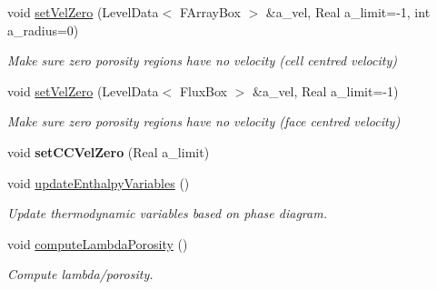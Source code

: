 \begin{DoxyCompactItemize}
\item 
\hypertarget{class_a_m_r_level_mushy_layer_aca6ded080c70e8ea040576861d832e09}{void \hyperlink{class_a_m_r_level_mushy_layer_aca6ded080c70e8ea040576861d832e09}{set\-Vel\-Zero} (Level\-Data$<$ F\-Array\-Box $>$ \&a\-\_\-vel, Real a\-\_\-limit=-\/1, int a\-\_\-radius=0)}\label{class_a_m_r_level_mushy_layer_aca6ded080c70e8ea040576861d832e09}

\begin{DoxyCompactList}\small\item\em Make sure zero porosity regions have no velocity (cell centred velocity) \end{DoxyCompactList}\item 
\hypertarget{class_a_m_r_level_mushy_layer_a14cee19cc957db8f3cce3e09fca9edf3}{void \hyperlink{class_a_m_r_level_mushy_layer_a14cee19cc957db8f3cce3e09fca9edf3}{set\-Vel\-Zero} (Level\-Data$<$ Flux\-Box $>$ \&a\-\_\-vel, Real a\-\_\-limit=-\/1)}\label{class_a_m_r_level_mushy_layer_a14cee19cc957db8f3cce3e09fca9edf3}

\begin{DoxyCompactList}\small\item\em Make sure zero porosity regions have no velocity (face centred velocity) \end{DoxyCompactList}\item 
\hypertarget{class_a_m_r_level_mushy_layer_ae3dcf62f2464245d7a3035cd1508061f}{void {\bfseries set\-C\-C\-Vel\-Zero} (Real a\-\_\-limit)}\label{class_a_m_r_level_mushy_layer_ae3dcf62f2464245d7a3035cd1508061f}

\item 
\hypertarget{class_a_m_r_level_mushy_layer_a8679a53e5cbddc3af173ea3ff5b574de}{void \hyperlink{class_a_m_r_level_mushy_layer_a8679a53e5cbddc3af173ea3ff5b574de}{update\-Enthalpy\-Variables} ()}\label{class_a_m_r_level_mushy_layer_a8679a53e5cbddc3af173ea3ff5b574de}

\begin{DoxyCompactList}\small\item\em Update thermodynamic variables based on phase diagram. \end{DoxyCompactList}\item 
\hypertarget{class_a_m_r_level_mushy_layer_a2e827a3ed1a3ced10f1b47bb0014731b}{void \hyperlink{class_a_m_r_level_mushy_layer_a2e827a3ed1a3ced10f1b47bb0014731b}{compute\-Lambda\-Porosity} ()}\label{class_a_m_r_level_mushy_layer_a2e827a3ed1a3ced10f1b47bb0014731b}

\begin{DoxyCompactList}\small\item\em Compute lambda/porosity. \end{DoxyCompactList}\end{DoxyCompactItemize}
